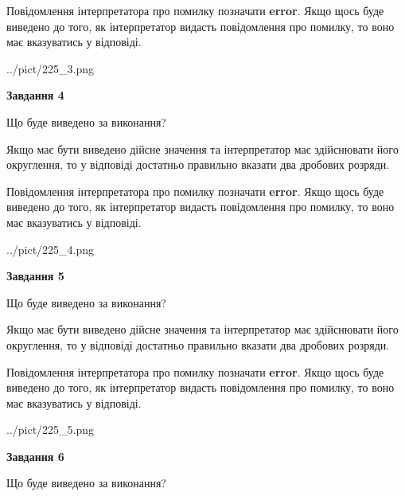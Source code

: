 \documentclass[12pt, ukrainian]{article}
\begin{document}
{\begin {Large}
Повідомлення інтерпретатора про помилку позначати \textbf{error}.
Якщо щось буде виведено до того, як інтерпретатор видасть повідомлення про помилку, 
то воно має вказуватись у відповіді. \par

\begin{center}
	{../pict/225_3.png}
\end{center}
\newpage

{\begin {center}\textbf{Завдання 4}\end {center}}\par
Що буде виведено за виконання? \par

Якщо має бути виведено дійсне значення та інтерпретатор має здійснювати його округлення, 
то у відповіді достатньо правильно вказати два дробових розряди.

Повідомлення інтерпретатора про помилку позначати \textbf{error}.
Якщо щось буде виведено до того, як інтерпретатор видасть повідомлення про помилку, 
то воно має вказуватись у відповіді. \par

\begin{center}
	{../pict/225_4.png}
\end{center}
\newpage

{\begin {center}\textbf{Завдання 5}\end {center}}\par
Що буде виведено за виконання? \par

Якщо має бути виведено дійсне значення та інтерпретатор має здійснювати його округлення, 
то у відповіді достатньо правильно вказати два дробових розряди.

Повідомлення інтерпретатора про помилку позначати \textbf{error}.
Якщо щось буде виведено до того, як інтерпретатор видасть повідомлення про помилку, 
то воно має вказуватись у відповіді. \par

\begin{center}
	{../pict/225_5.png}
\end{center}
\newpage

{\begin {center}\textbf{Завдання 6}\end {center}}\par
Що буде виведено за виконання? \par


\end{Large}}
\end{document}
